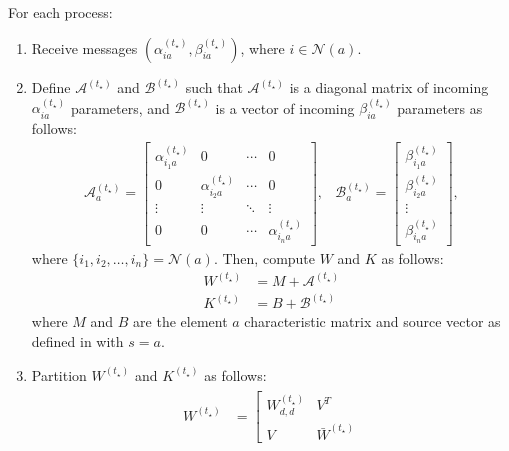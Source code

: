For each  process:
\begin{enumerate}
	\item Receive messages $(\alpha_{ia}^{(t_\star)}, \beta_{ia}^{(t_\star)})$, where $i\in\mathcal{N}(a)$.
	\item Define $\mathcal{A}^{(t_\star)}$ and $\mathcal{B}^{(t_\star)}$ such that $\mathcal{A}^{(t_\star)}$ is a diagonal matrix of incoming $\alpha_{ia}^{(t_\star)}$ parameters, and $\mathcal{B}^{(t_\star)}$ is a vector of incoming $\beta_{ia}^{(t_\star)}$ parameters as follows:
		\begin{equation}
			\begin{array}{cc}
				\mathcal{A}_a^{(t_\star)} =\left[\begin{array}{cccc}
					\alpha_{i_1a}^{(t_\star)} & 0 & \cdots & 0\\
					0 & \alpha_{i_2a}^{(t_\star)} & \cdots & 0\\
					\vdots & \vdots & \ddots & \vdots\\
					0 & 0 & \cdots & \alpha_{i_na}^{(t_\star)}
				\end{array}\right],
				& 
				\mathcal{B}_a^{(t_\star)} =\left[\begin{array}{c}
					\beta_{i_1a}^{(t_\star)}\\
					\beta_{i_2a}^{(t_\star)}\\
					\vdots\\
					\beta_{i_na}^{(t_\star)}
				\end{array}\right],
			\end{array}
			\label{eqn:fWK}
		\end{equation}
		where $\{ i_1, i_2, \dots, i_n \} = \mathcal{N}(a)$.
		Then, compute $W$ and $K$ as follows:
		\begin{align}
			W^{(t_\star)} &=M +\mathcal{A}^{(t_\star)}\\
			K^{(t_\star)} &=B +\mathcal{B}^{(t_\star)}
		\end{align}
		where  $M$ and $B$ are the element $a$ characteristic matrix and source vector as defined in  with $s=a$. 
	\item Partition $W^{(t_\star)}$ and $K^{(t_\star)}$ as follows:
		\begin{equation}
			\begin{array}{cc}
				\begin{aligned}
					W^{(t_\star)} & =\left[
					\begin{array}{cc}
						W^{(t_\star)}_{d,d} & V^{T}\\
						V & \bar{W}^{(t_\star)}

\end{array}
\end{aligned}
\end{array}
\end{equation}
\end{enumerate}
